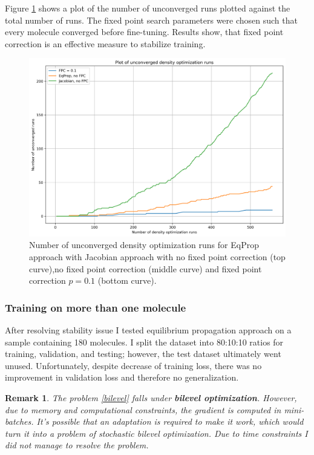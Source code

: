 \documentclass[a4paper,10.5pt]{report}
\newtheorem{remark}{Remark}
\begin{document}
Figure \ref{fig:stability} shows a plot of the number of unconverged runs plotted against the total number of runs. The fixed point search parameters were chosen such that every molecule converged before fine-tuning. Results show, that fixed point correction is an effective measure to stabilize training.
\begin{figure}[H]
 \centering
 \includegraphics[scale=0.5]{images/stability_plot.png}
 \caption{Number of unconverged density optimization runs for EqProp approach with Jacobian approach with no fixed point correction (top curve),no fixed point correction (middle curve) and  fixed point correction $p=0.1$ (bottom curve).}
 \label{fig:stability}
\end{figure}


\subsubsection{Training on more than one molecule}
After resolving stability issue I tested equilibrium propagation approach on a sample containing 180 molecules. I split the dataset into 80:10:10 ratios for training, validation, and testing; however, the test dataset ultimately went unused. Unfortunately, despite decrease of training loss, there was no improvement in validation loss and therefore no generalization.

\begin{remark}
 The problem \ref{bilevel} falls under \textbf{bilevel optimization}. However, due to memory and computational constraints, the gradient is computed in mini-batches. It's possible that an adaptation is required to make it work, which would turn it into a problem of stochastic bilevel optimization. Due to time constraints I did not manage to resolve the problem.
\end{remark}
\end{document}
